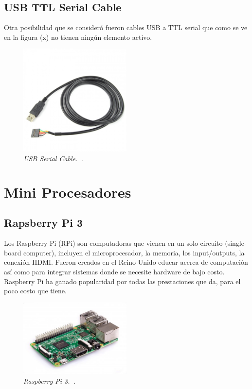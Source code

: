 \subsection{USB TTL Serial Cable}

Otra posibilidad que se consideró fueron cables USB a TTL serial que como se ve en la figura (x) no tienen ningún elemento activo.

\begin{figure}[h!]
  \centering
  \includegraphics[width=0.5\textwidth, keepaspectratio]{images/usb-serial-cable}
  \caption{\textit{USB Serial Cable.~\cite{USBSerialCable}.}}
  \label{fig:usb-serial-cable}
\end{figure}

\section{Mini Procesadores}

\subsection{Rapsberry Pi 3}

Los Raspberry Pi  (RPi) son computadoras que vienen en un solo circuito (single-board computer), incluyen el microprocesador, la memoria, los input/outputs, la conexión HDMI. Fueron creados en el Reino Unido educar acerca de computación así como para integrar sistemas donde se necesite hardware de bajo costo. Raspberry Pi ha ganado popularidad por todas las prestaciones que da, para el poco costo que tiene.

\begin{figure}[h!]
  \centering
  \includegraphics[width=0.5\textwidth, keepaspectratio]{images/rpi3}
  \caption{\textit{Raspberry Pi 3.~\cite{RPi3}.}}
  \label{fig:rpi3}
\end{figure}

